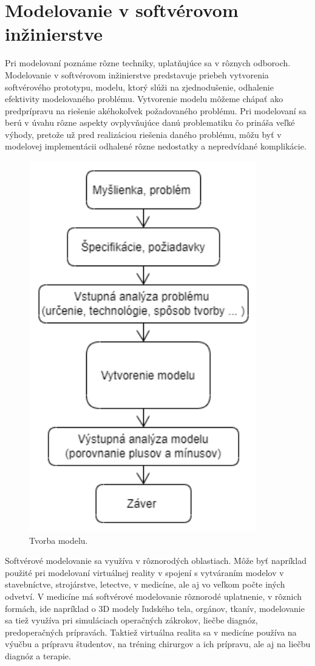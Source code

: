 \documentclass[10pt,twoside,slovak,a4paper]{article}
\begin{document}
\section{Modelovanie v softvérovom inžinierstve} \label{modelovanie}
Pri modelovaní poznáme rôzne techniky, uplatňujúce sa v rôznych odboroch. Modelovanie v softvérovom inžinierstve predstavuje priebeh vytvorenia softvérového prototypu, modelu, ktorý slúži na zjednodušenie, odhalenie efektivity modelovaného problému. Vytvorenie modelu môžeme chápať ako predprípravu na riešenie akéhokoľvek požadovaného problému. Pri modelovaní sa berú v úvahu rôzne aspekty ovplyvňujúce danú problematiku čo prináša veľké výhody, pretože už pred realizáciou riešenia daného problému, môžu byť v modelovej implementácii odhalené rôzne nedostatky a nepredvídané komplikácie. 

\begin{figure}[tbh]
\centering
\includegraphics[scale=1.0]{diagram.pdf}
\caption{Tvorba modelu.}
\label{f:model}
\end{figure}

Softvérové modelovanie sa využíva v rôznorodých oblastiach. Môže byť napríklad použité pri modelovaní virtuálnej reality v spojení s vytváraním modelov v stavebníctve, strojárstve, letectve, v medicíne, ale aj vo veľkom počte iných odvetví. V medicíne má softvérové modelovanie rôznorodé uplatnenie, v rôznich formách, ide napríklad o 3D modely ľudského tela, orgánov, tkanív, modelovanie sa tiež využíva pri simuláciach operačných zákrokov, liečbe diagnóz, predoperačných prípravách. Taktiež virtuálna realita sa v medicíne používa na výučbu a prípravu študentov, na tréning chirurgov a ich prípravu, ale aj na liečbu diagnóz a terapie. \cite{2018}   
\end{document}
